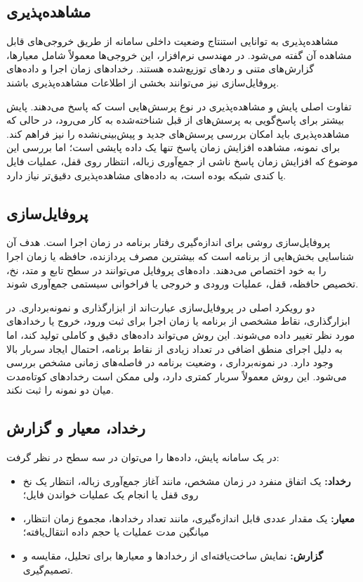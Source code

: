 \subsection{مشاهده‌پذیری}

مشاهده‌پذیری به توانایی استنتاج وضعیت داخلی سامانه از
طریق خروجی‌های قابل مشاهده آن گفته می‌شود. در مهندسی نرم‌افزار، این خروجی‌ها
معمولاً شامل معیارها، گزارش‌های متنی و ردهای توزیع‌شده هستند. رخدادهای زمان اجرا
و داده‌های پروفایل‌سازی نیز می‌توانند بخشی از اطلاعات مشاهده‌پذیری باشند.

تفاوت اصلی پایش و مشاهده‌پذیری در نوع پرسش‌هایی است که پاسخ می‌دهند. پایش بیشتر
برای پاسخ‌گویی به پرسش‌های از قبل شناخته‌شده به کار می‌رود، در حالی که
مشاهده‌پذیری باید امکان بررسی پرسش‌های جدید و پیش‌بینی‌نشده را نیز فراهم کند.
برای نمونه، مشاهده افزایش زمان پاسخ تنها یک داده پایشی است؛ اما بررسی این موضوع
که افزایش زمان پاسخ ناشی از جمع‌آوری زباله، انتظار روی قفل، عملیات فایل یا کندی
شبکه بوده است، به داده‌های مشاهده‌پذیری دقیق‌تر نیاز دارد.

\subsection{پروفایل‌سازی}

پروفایل‌سازی روشی برای اندازه‌گیری رفتار برنامه در زمان
اجرا است. هدف آن شناسایی بخش‌هایی از برنامه است که بیشترین مصرف پردازنده،
حافظه یا زمان اجرا را به خود اختصاص می‌دهند. داده‌های پروفایل می‌توانند در سطح
تابع و متد، نخ، تخصیص حافظه، قفل، عملیات ورودی و خروجی یا فراخوانی سیستمی
جمع‌آوری شوند.

دو رویکرد اصلی در پروفایل‌سازی عبارت‌اند از ابزارگذاری و نمونه‌برداری.
در ابزارگذاری، نقاط مشخصی از برنامه یا زمان اجرا
برای ثبت ورود، خروج یا رخدادهای مورد نظر تغییر داده می‌شوند. این روش می‌تواند
داده‌های دقیق و کاملی تولید کند، اما به دلیل اجرای منطق اضافی در تعداد زیادی از
نقاط برنامه، احتمال ایجاد سربار بالا وجود دارد. در نمونه‌برداری
، وضعیت برنامه در فاصله‌های زمانی مشخص بررسی می‌شود. این
روش معمولاً سربار کمتری دارد، ولی ممکن است رخدادهای کوتاه‌مدت میان دو نمونه را
ثبت نکند.

\subsection{رخداد، معیار و گزارش}

در یک سامانه پایش، داده‌ها را می‌توان در سه سطح در نظر گرفت:

\begin{itemize}
    \item \textbf{رخداد:} یک اتفاق منفرد در زمان مشخص، مانند آغاز جمع‌آوری زباله،
    انتظار یک نخ روی قفل یا انجام یک عملیات خواندن فایل؛
    \item \textbf{معیار:} یک مقدار عددی قابل اندازه‌گیری، مانند تعداد رخدادها،
    مجموع زمان انتظار، میانگین مدت عملیات یا حجم داده انتقال‌یافته؛
    \item \textbf{گزارش:} نمایش ساخت‌یافته‌ای از رخدادها و معیارها برای تحلیل،
    مقایسه و تصمیم‌گیری.
\end{itemize}

